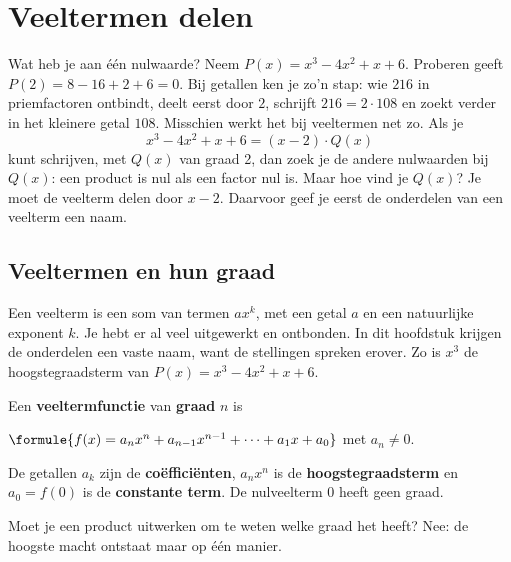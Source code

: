 \section{Veeltermen delen}

Wat heb je aan één nulwaarde? Neem $P(x) = x^3 - 4x^2 + x + 6$. Proberen geeft $P(2) = 8 - 16 + 2 + 6 = 0$. Bij getallen ken je zo'n stap: wie $216$ in priemfactoren ontbindt, deelt eerst door $2$, schrijft $216 = 2 \cdot 108$ en zoekt verder in het kleinere getal $108$. Misschien werkt het bij veeltermen net zo. Als je
\[x^3 - 4x^2 + x + 6 = (x - 2) \cdot Q(x)\]
kunt schrijven, met $Q(x)$ van graad 2, dan zoek je de andere nulwaarden bij $Q(x)$: een product is nul als een factor nul is. Maar hoe vind je $Q(x)$? Je moet de veelterm delen door $x - 2$. Daarvoor geef je eerst de onderdelen van een veelterm een naam.

\subsection{Veeltermen en hun graad}

Een veelterm is een som van termen $a x^k$, met een getal $a$ en een natuurlijke exponent $k$. Je hebt er al veel uitgewerkt en ontbonden. In dit hoofdstuk krijgen de onderdelen een vaste naam, want de stellingen spreken erover. Zo is $x^3$ de hoogstegraadsterm van $P(x) = x^3 - 4x^2 + x + 6$.

\begin{theorie}
Een \textbf{\textcolor{accent}{veeltermfunctie}} van \textbf{\textcolor{accent}{graad}} $n$ is

\qquad $\formule{f(x) = a_n x^n + a_{n-1}x^{n-1} + \cdots + a_1 x + a_0}$ \quad met $a_n \neq 0$.

De getallen $a_k$ zijn de \textbf{\textcolor{accent}{coëfficiënten}}, $a_n x^n$ is de \textbf{\textcolor{accent}{hoogstegraadsterm}} en $a_0 = f(0)$ is de \textbf{\textcolor{accent}{constante term}}. De nulveelterm $0$ heeft geen graad.
\end{theorie}

Moet je een product uitwerken om te weten welke graad het heeft? Nee: de hoogste macht ontstaat maar op één manier.

